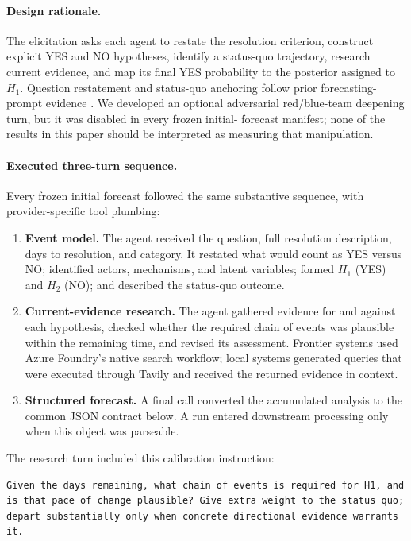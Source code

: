 \paragraph{Design rationale.}
The elicitation asks each agent to restate the resolution criterion, construct explicit
YES and NO hypotheses, identify a status-quo trajectory, research current evidence,
and map its final YES probability to the posterior assigned to $H_1$.  Question
restatement and status-quo anchoring follow prior forecasting-prompt evidence
\citep{halawi2024approaching,wilson2025automated}.  We developed an optional
adversarial red/blue-team deepening turn, but it was disabled in every frozen initial-
forecast manifest; none of the results in this paper should be interpreted as measuring
that manipulation.

\paragraph{Executed three-turn sequence.}
Every frozen initial forecast followed the same substantive sequence, with
provider-specific tool plumbing:

\begin{enumerate}
  \item \textbf{Event model.}  The agent received the question, full resolution
        description, days to resolution, and category.  It restated what would count
        as YES versus NO; identified actors, mechanisms, and latent variables; formed
        $H_1$ (YES) and $H_2$ (NO); and described the status-quo outcome.
  \item \textbf{Current-evidence research.}  The agent gathered evidence for and
        against each hypothesis, checked whether the required chain of events was
        plausible within the remaining time, and revised its assessment.  Frontier
        systems used Azure Foundry's native search workflow; local systems generated
        queries that were executed through Tavily and received the returned evidence
        in context.
  \item \textbf{Structured forecast.}  A final call converted the accumulated analysis
        to the common JSON contract below.  A run entered downstream processing only
        when this object was parseable.
\end{enumerate}

The research turn included this calibration instruction:

\begin{small}
\begin{verbatim}
Given the days remaining, what chain of events is required for H1, and
is that pace of change plausible? Give extra weight to the status quo;
depart substantially only when concrete directional evidence warrants it.
\end{verbatim}
\end{small}

